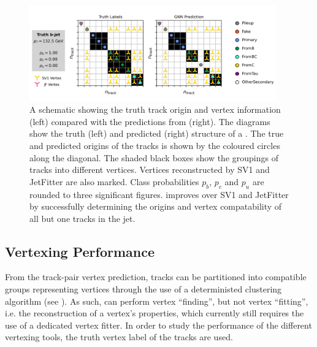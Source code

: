  \begin{figure}[!p]
    \centering
    \includegraphics[width=0.95\textwidth]{chapters/gnn_tagger/figs/bjet_vertex2.pdf}
    \caption{
        A schematic showing the truth track origin and vertex information (left) compared with the predictions from \GNN (right).
        The diagrams show the truth (left) and predicted (right) structure of a \bjet.
        The true and predicted origins of the tracks is shown by the coloured circles along the diagonal.
        The shaded black boxes show the groupings of tracks into different vertices.
        Vertices reconstructed by SV1 and JetFitter are also marked.
        Class probabilities $p_b$, $p_c$ and $p_u$ are rounded to three significant figures.
        \GNN improves over SV1 and JetFitter by successfully determining the origins and vertex compatability of all but one tracks in the jet.
    }
    \label{fig:bjet_diag_2}
 \end{figure}

 

\subsection{Vertexing Performance}\label{sec:gnn_vert_perf}

From the track-pair vertex prediction, tracks can be partitioned into compatible groups representing vertices through the use of a deterministed clustering algorithm (see ).
As such, \GNN can perform vertex ``finding'', but not vertex ``fitting'', i.e. the reconstruction of a vertex's properties, which currently still requires the use of a dedicated vertex fitter.
In order to study the performance of the different vertexing tools, the truth vertex label of the tracks are used.

